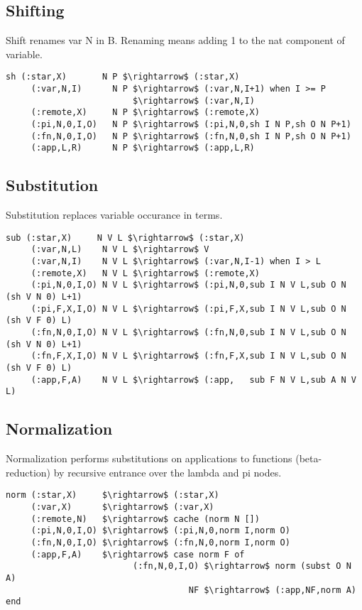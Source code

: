 \documentclass{article}
\begin{document}
\newpage
\subsection{Shifting}
Shift renames var N in B. Renaming means adding 1 to the nat component of variable.

\begin{lstlisting}[mathescape=true]
  sh (:star,X)       N P $\rightarrow$ (:star,X)
     (:var,N,I)      N P $\rightarrow$ (:var,N,I+1) when I >= P
                         $\rightarrow$ (:var,N,I)
     (:remote,X)     N P $\rightarrow$ (:remote,X)
     (:pi,N,0,I,O)   N P $\rightarrow$ (:pi,N,0,sh I N P,sh O N P+1)
     (:fn,N,0,I,O)   N P $\rightarrow$ (:fn,N,0,sh I N P,sh O N P+1)
     (:app,L,R)      N P $\rightarrow$ (:app,L,R)
\end{lstlisting}

\subsection{Substitution}
Substitution replaces variable occurance in terms.

\begin{lstlisting}[mathescape=true]
 sub (:star,X)     N V L $\rightarrow$ (:star,X)
     (:var,N,L)    N V L $\rightarrow$ V
     (:var,N,I)    N V L $\rightarrow$ (:var,N,I-1) when I > L
     (:remote,X)   N V L $\rightarrow$ (:remote,X)
     (:pi,N,0,I,O) N V L $\rightarrow$ (:pi,N,0,sub I N V L,sub O N (sh V N 0) L+1)
     (:pi,F,X,I,O) N V L $\rightarrow$ (:pi,F,X,sub I N V L,sub O N (sh V F 0) L)
     (:fn,N,0,I,O) N V L $\rightarrow$ (:fn,N,0,sub I N V L,sub O N (sh V N 0) L+1)
     (:fn,F,X,I,O) N V L $\rightarrow$ (:fn,F,X,sub I N V L,sub O N (sh V F 0) L)
     (:app,F,A)    N V L $\rightarrow$ (:app,   sub F N V L,sub A N V L)
\end{lstlisting}

\subsection{Normalization}
Normalization performs substitutions on applications to functions (beta-reduction)
by recursive entrance over the lambda and pi nodes.

\begin{lstlisting}[mathescape=true]
norm (:star,X)     $\rightarrow$ (:star,X)
     (:var,X)      $\rightarrow$ (:var,X)
     (:remote,N)   $\rightarrow$ cache (norm N [])
     (:pi,N,0,I,O) $\rightarrow$ (:pi,N,0,norm I,norm O)
     (:fn,N,0,I,O) $\rightarrow$ (:fn,N,0,norm I,norm O)
     (:app,F,A)    $\rightarrow$ case norm F of
                         (:fn,N,0,I,O) $\rightarrow$ norm (subst O N A)
                                    NF $\rightarrow$ (:app,NF,norm A) end
\end{lstlisting}
\end{document}
